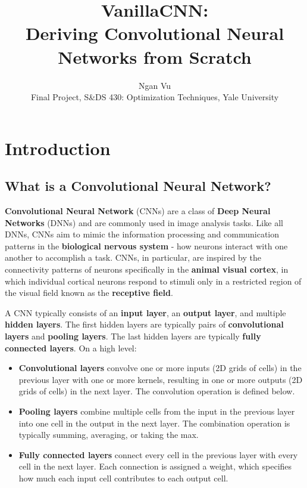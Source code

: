 \documentclass[12pt]{article}
\title{VanillaCNN:\\Deriving Convolutional Neural Networks from Scratch}
\author{Ngan Vu \\ Final Project, S\&DS 430: Optimization Techniques, Yale University}
\begin{document}
\maketitle
\tableofcontents

\section{Introduction}
\subsection{What is a Convolutional Neural Network?}
\textbf{Convolutional Neural Network} (CNNs) are a class of \textbf{Deep Neural Networks} (DNNs) and are commonly used in image analysis tasks. Like all DNNs, CNNs aim to mimic the information processing and communication patterns in the \textbf{biological nervous system} - how neurons interact with one another to accomplish a task. CNNs, in particular, are inspired by the connectivity patterns of neurons specifically in the \textbf{animal visual cortex}, in which individual cortical neurons respond to stimuli only in a restricted region of the visual field known as the \textbf{receptive field}.

A CNN typically consists of an \textbf{input layer}, an \textbf{output layer}, and multiple \textbf{hidden layers}. The first hidden layers are typically pairs of \textbf{convolutional layers} and \textbf{pooling layers}. The last hidden layers are typically \textbf{fully connected layers}. On a high level:
\begin{itemize}
    \item \textbf{Convolutional layers} convolve one or more inputs (2D grids of cells) in the previous layer with one or more kernels, resulting in one or more outputs (2D grids of cells) in the next layer. The convolution operation is defined below.
    \item \textbf{Pooling layers} combine multiple cells from the input in the previous layer into one cell in the output in the next layer. The combination operation is typically summing, averaging, or taking the max.
    \item \textbf{Fully connected layers} connect every cell in the previous layer with every cell in the next layer. Each connection is assigned a weight, which specifies how much each input cell contributes to each output cell.
\end{itemize}
\end{document}
